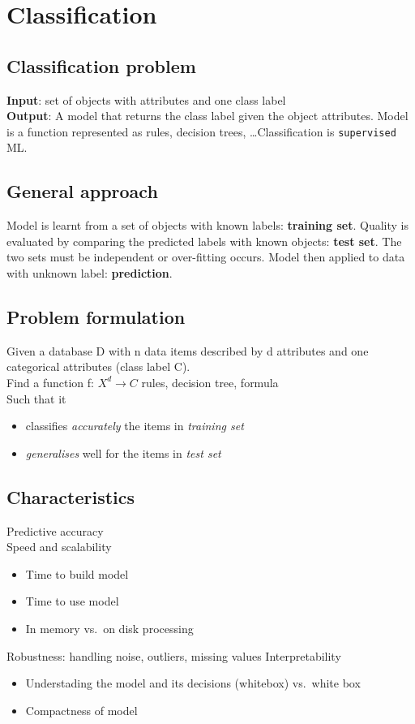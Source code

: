 \section{Classification}
\subsection{Classification problem}
\textbf{Input}: set of objects with attributes and one class label \\

\textbf{Output}: A model that returns the class label given the object
attributes. Model is a function represented as rules, decision trees,
\ldots Classification is \texttt{supervised} ML.

\subsection{General approach}
Model is learnt from a set of objects with known labels:
\textbf{training set}. Quality is evaluated by comparing the predicted
labels with known objects: \textbf{test set}. The two sets must be
independent or over-fitting occurs. Model then applied to data with
unknown label: \textbf{prediction}.

\subsection{Problem formulation}
Given a database D with n data items described by d attributes and one
categorical attributes (class label C). \\
Find a function f: $ X^d \rightarrow C $ rules, decision tree, formula \\
Such that it
\begin{itemize}
\item classifies \textit{accurately} the items in \textit{training
    set}
\item \textit{{generalises}} well for the items in \textit{test set}
\end{itemize}

\subsection{Characteristics}
Predictive accuracy \\
Speed and scalability
\begin{itemize}
\item Time to build model
\item Time to use model
\item In memory vs.\ on disk processing
\end{itemize}
Robustness: handling noise, outliers, missing values
Interpretability
\begin{itemize}
\item Understading the model and its decisions (whitebox) vs.\ white
  box
\item Compactness of model
\end{itemize}

